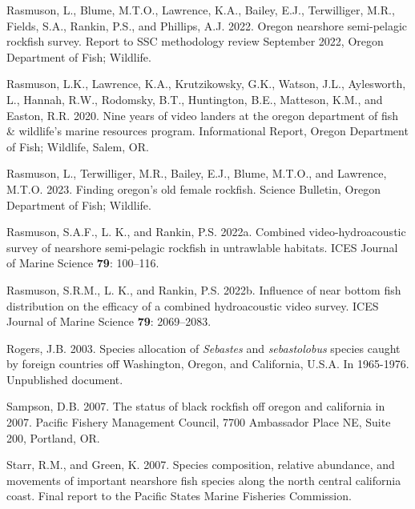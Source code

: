 \documentclass[11pt,
  english,
  letterpaper,
]{article}
\newlength{\cslhangindent}
\newenvironment{CSLReferences}[2] %
 {%
  \setlength{\parindent}{0pt}
  \ifodd #1 \everypar{\setlength{\hangindent}{\cslhangindent}}\ignorespaces\fi
  \ifnum #2 > 0
  \setlength{\parskip}{#2\baselineskip}
  \fi
 }%
 {}
\begin{document}
\begin{CSLReferences}{1}{0}
\leavevmode{}%
Rasmuson, L., Blume, M.T.O., Lawrence, K.A., Bailey, E.J., Terwilliger, M.R., Fields, S.A., Rankin, P.S., and Phillips, A.J. 2022. Oregon nearshore semi-pelagic rockfish survey. Report to SSC methodology review September 2022, Oregon Department of Fish; Wildlife.

\leavevmode{}%
Rasmuson, L.K., Lawrence, K.A., Krutzikowsky, G.K., Watson, J.L., Aylesworth, L., Hannah, R.W., Rodomsky, B.T., Huntington, B.E., Matteson, K.M., and Easton, R.R. 2020. Nine years of video landers at the oregon department of fish \& wildlife's marine resources program. Informational Report, Oregon Department of Fish; Wildlife, Salem, {OR}.

\leavevmode{}%
Rasmuson, L., Terwilliger, M.R., Bailey, E.J., Blume, M.T.O., and Lawrence, M.T.O. 2023. Finding oregon's old female rockfish. Science Bulletin, Oregon Department of Fish; Wildlife.

\leavevmode{}%
Rasmuson, S.A.F., L. K., and Rankin, P.S. 2022a. Combined video-hydroacoustic survey of nearshore semi-pelagic rockfish in untrawlable habitats. {ICES} Journal of Marine Science \textbf{79}: 100--116.

\leavevmode{}%
Rasmuson, S.R.M., L. K., and Rankin, P.S. 2022b. Influence of near bottom fish distribution on the efficacy of a combined hydroacoustic video survey. {ICES} Journal of Marine Science \textbf{79}: 2069--2083.

\leavevmode{}%
Rogers, J.B. 2003. Species allocation of \emph{{Sebastes}} and \emph{sebastolobus} species caught by foreign countries off {Washington}, {Oregon}, and {California}, {U}.{S}.{A}. In 1965-1976. Unpublished document.

\leavevmode{}%
Sampson, D.B. 2007. The status of black rockfish off oregon and california in 2007. Pacific Fishery Management Council, 7700 Ambassador Place NE, Suite 200, Portland, OR.

\leavevmode{}%
Starr, R.M., and Green, K. 2007. Species composition, relative abundance, and movements of important nearshore fish species along the north central california coast. Final report to the Pacific States Marine Fisheries Commission.


\end{CSLReferences}
\end{document}
